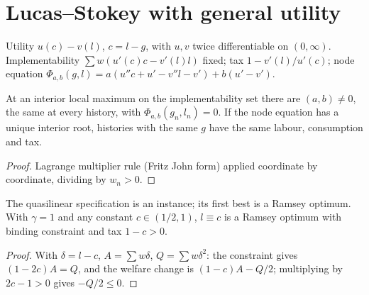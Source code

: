 \section{Lucas--Stokey with general utility}

\begin{definition}
\label{def:lsg}
\leanok
Utility $u(c)-v(l)$, $c=l-g$, with $u,v$ twice differentiable on $(0,\infty)$. Implementability
$\sum w(u'(c)c-v'(l)l)$ fixed; tax $1-v'(l)/u'(c)$; node equation
$\Phi_{a,b}(g,l)=a(u''c+u'-v''l-v')+b(u'-v')$.
\end{definition}

\begin{theorem}
\label{thm:lsg}
\leanok
{}
At an interior local maximum on the implementability set there are $(a,b)\ne0$, the same at every history, with
$\Phi_{a,b}(g_n,l_n)=0$. If the node equation has a unique interior root, histories with the same $g$ have the same labour,
consumption and tax.
\end{theorem}
\begin{proof}
\leanok
Lagrange multiplier rule (Fritz John form) applied coordinate by coordinate, dividing by $w_n>0$.
\end{proof}

\begin{theorem}
\label{thm:lsg_witness}
\leanok
{}
The quasilinear specification is an instance; its first best is a Ramsey optimum. With $\gamma=1$ and any constant
$c\in(1/2,1)$, $l\equiv c$ is a Ramsey optimum with binding constraint and tax $1-c>0$.
\end{theorem}
\begin{proof}
\leanok
With $\delta=l-c$, $A=\sum w\delta$, $Q=\sum w\delta^2$: the constraint gives $(1-2c)A=Q$, and the welfare change is
$(1-c)A-Q/2$; multiplying by $2c-1>0$ gives $-Q/2\le0$.
\end{proof}
